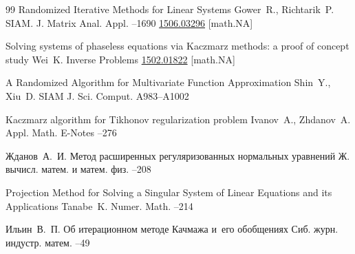 \begin{thebibliography}{99}
\paper Randomized Iterative Methods for Linear Systems
\by Gower~R., Richtarik~P.
\jour SIAM. J. Matrix Anal. Appl.
–1690
\arxiv \href{https://arxiv.org/abs/1506.03296}{1506.03296} [math.NA]

\paper Solving systems of phaseless equations via Kaczmarz methods: a proof of concept study
\by Wei~K.
\jour Inverse Problems
\arxiv \href{https://arxiv.org/abs/1502.01822}{1502.01822} [math.NA]

\paper A Randomized Algorithm for Multivariate Function Approximation
\by Shin~Y., Xiu~D.
\jour SIAM J. Sci. Comput.
\pages A983--A1002


\paper Kaczmarz algorithm for Tikhonov regularization problem
\by Ivanov~A., Zhdanov~A.
\jour Appl. Math. E-Notes
--276

\by Жданов~А.~И.
\paper Метод расширенных регуляризованных нормальных уравнений
\jour Ж. вычисл. матем. и матем. физ.
--208

\paper Projection Method for Solving a Singular System of Linear Equations and its Applications
\by Tanabe~K.
\jour Numer. Math.
--214

\by Ильин~В.~П.
\paper Об итерационном методе Качмажа и~его обобщениях
\jour Сиб. журн. индустр. матем.
--49


\end{thebibliography}
